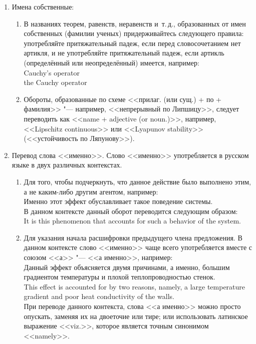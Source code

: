 \documentclass[a5paper, 10pt, twoside, numbers=enddot]{scrartcl}
\newcommand{\etc}{и~т.\,д.\xspace}
\begin{document}
\begin{enumerate}
  \item Имена собственные:
    \begin{enumerate}
      \item В названиях теорем, равенств, неравенств \etc, образованных от имен собственных (фамилии
        ученых) придерживайтесь следующего правила: употребляйте притяжательный падеж, если перед
        словосочетанием нет артикля, и не употребляйте притяжательный падеж, если артикль
        (определённый или неопределённый) имеется, например:\\ [4pt]
        \textsf{
          Cauchy's operator\\
          the Cauchy operator
        }

      \item Обороты, образованные по схеме <<прилаг. (или сущ.) + по + фамилия>> "--- например,
        <<непрерывный по Липшицу>>, следует переводить как <<name + adjective (or noun.)>>,
        например, <<Lipschitz continuous>> или <<Lyapunov stability>> (<<устойчивость по
        Ляпунову>>).
    \end{enumerate}

  \item Перевод слова <<именно>>. Слово <<именно>> употребляется в русском языке в двух различных
    контекстах.
    \begin{enumerate}
      \item Для того, чтобы подчеркнуть, что данное действие было выполнено этим, а не каким-либо
        другим агентом, например:\\ [4pt]
        \textsf{Именно этот эффект обуславливает такое поведение системы.}\\ [4pt]
        В данном контексте данный оборот переводится следующим образом:\\ [4pt]
        \textsf{It is this phenomenon that accounts for such a behavior of the system.}

      \item Для указания начала расшифровки предыдущего члена предложения. В данном контексте слово
        <<именно>> чаще всего употребляется вместе с союзом <<а>> "--- <<а именно>>, например:\\ [4pt]
        \textsf{
          Данный эффект объясняется двумя причинами, а именно, большим градиентом температуры и
          плохой теплопроводностью стенок.\\
          This effect is accounted for by two reasons, namely, a large temperature gradient and poor
          heat conductivity of the walls.\\ [4pt]
        }
        При переводе данного контекста, слова <<а именно>> можно просто опускать, заменяя их на
        двоеточие или тире; или использовать латинское выражение <<viz.>>, которое является точным
        синонимом <<namely>>.
    \end{enumerate}


\end{enumerate}
\end{document}

